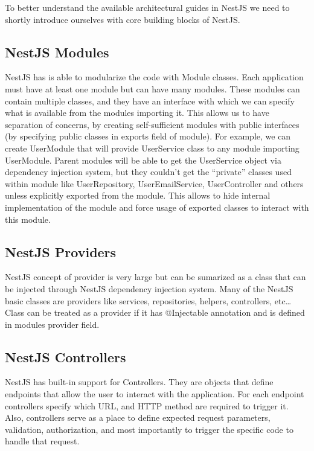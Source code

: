 To better understand the available architectural guides in NestJS we need to shortly introduce ourselves with
core building blocks of NestJS\@.

\subsection{NestJS Modules}\label{subsec:nestjs-modules}

NestJS has is able to modularize the code with Module classes.
Each application must have at least one module but can have many modules.
These modules can contain multiple classes, and they have an interface with which we can specify
what is available from the modules importing it.
This allows us to have separation of concerns, by creating self-sufficient modules with public interfaces
(by specifying public classes in exports field of module).
For example, we can create UserModule that will provide UserService class to any module importing UserModule.
Parent modules will be able to get the UserService object via dependency injection system, but they couldn't
get the ``private'' classes used within module like UserRepository, UserEmailService, UserController and others unless
explicitly exported from the module.
This allows to hide internal implementation of the module and force usage of exported classes
to interact with this module.

\subsection{NestJS Providers}\label{subsec:nestjs-providers}
NestJS concept of provider is very large but can be sumarized as a class that can be injected through NestJS dependency
injection system.
Many of the NestJS basic classes are providers like services, repositories, helpers, controllers, etc\ldots
Class can be treated as a provider if it has @Injectable annotation and is defined in modules provider field.

\subsection{NestJS Controllers}\label{subsec:nestjs-controllers}

NestJS has built-in support for Controllers.
They are objects that define endpoints that allow the user to interact with the application.
For each endpoint controllers specify which URL, and HTTP method are required to trigger it.
Also, controllers serve as a place to define expected request parameters, validation, authorization, and most importantly
to trigger the specific code to handle that request.

